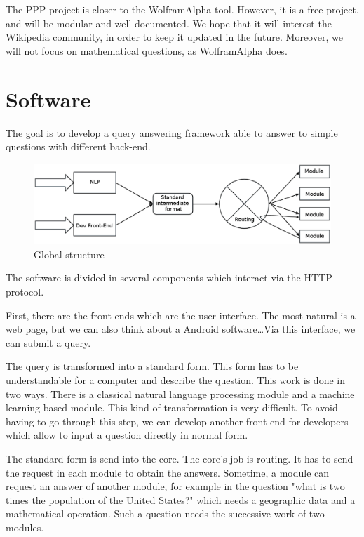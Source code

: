 \documentclass[a4paper,10pt]{article}
\begin{document}
The PPP project is closer to the WolframAlpha tool. However, it is a free project,
and will be modular and well documented. We hope that it will interest the 
Wikipedia community, in order to keep it updated in the future. Moreover,
we will not focus on mathematical questions, as WolframAlpha does.

\section{Software}

The goal is to develop a query answering framework able to answer to simple questions with different back-end. 

\begin{figure}[!h]
    \centering
    \includegraphics[scale=0.39]{images/Structure-PPP-en.eps}
    \caption{Global structure}
\end{figure}

The software is divided in several components which interact via the HTTP protocol.

First, there are the front-ends which are the user interface. The most natural is 
a web page, but we can also think about a Android software\ldots Via this interface, 
we can submit a query.

The query is transformed into a standard form. This form has to be understandable 
for a computer and describe the question. This work is done in two ways. There is 
a classical natural language processing module and a machine learning-based module. 
This kind of transformation is very difficult. To avoid having to go through this 
step, we can develop another front-end for developers which allow to input a question
 directly in normal form.

The standard form is send into the core. The core's job is routing. It has to send 
the request in each module to obtain the answers. Sometime, a module can request 
an answer of another module, for example in the question "what is two times the 
population of the United States?" which needs a geographic data and a mathematical
 operation. Such a question needs the successive work of two modules.
\end{document}
